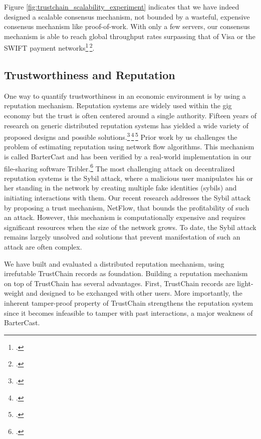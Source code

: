 \documentclass[USenglish]{article}
\begin{document}
Figure \ref{fig:trustchain_scalability_experiment} indicates that we have indeed designed a scalable consensus mechanism, not bounded by a wasteful, expensive consensus mechanism like proof-of-work.
With only a few servers, our consensus mechanism is able to reach global throughput rates surpassing that of Visa or the SWIFT payment networks\footcite{visatransactions}\,\footcite{swifttransactions}.

\subsection{Trustworthiness and Reputation}
\label{sec:reputation}
One way to quantify trustworthiness in an economic environment is by using a reputation mechanism.
Reputation systems are widely used within the gig economy but the trust is often centered around a single authority.
Fifteen years of research on generic distributed reputation systems has yielded a wide variety of proposed designs and possible solutions.\footcite{delaviz2010improving}\,\footcite{delaviz2012sybilres}\,\footcite{kamvar2003eigentrust}
Prior work by us challenges the problem of estimating reputation using network flow algorithms.
This mechanism is called BarterCast and has been verified by a real-world implementation in our file-sharing software Tribler.\footcite{meulpolder2009bartercast}
The most challenging attack on decentralized reputation systems is the Sybil attack, where a malicious user manipulates his or her standing in the network by creating multiple fake identities (sybils) and initiating interactions with them.
Our recent research addresses the Sybil attack by proposing a trust mechanism, NetFlow, that bounds the profitability of such an attack.
However, this mechanism is computationally expensive and requires significant resources when the size of the network grows.
To date, the Sybil attack remains largely unsolved and solutions that prevent manifestation of such an attack are often complex.

We have built and evaluated a distributed reputation mechanism, using irrefutable TrustChain records as foundation.
Building a reputation mechanism on top of TrustChain has several advantages.
First, TrustChain records are light-weight and designed to be exchanged with other users.
More importantly, the inherent tamper-proof property of TrustChain strengthens the reputation system since it becomes infeasible to tamper with past interactions, a major weakness of BarterCast.
\end{document}
